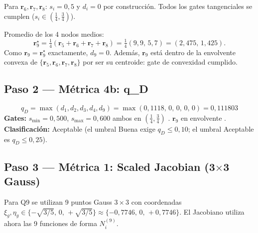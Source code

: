 \documentclass[11pt,a4paper]{article}
\begin{document}
\begin{stepbox}[title={Aristas restantes (nodos medios en el punto medio exacto)}]
Para $\mathbf{r}_6, \mathbf{r}_7, \mathbf{r}_8$: $s_i = 0{,}5$ y $d_i = 0$ por construcci\'on. Todos los gates tangenciales se cumplen ($s_i\in(\tfrac{1}{4},\tfrac{3}{4})$).
\end{stepbox}

\begin{stepbox}[title={Centroide $\mathbf{r}_9$}]
Promedio de los 4 nodos medios:
\[
\mathbf{r}_9^{\star} = \tfrac{1}{4}(\mathbf{r}_5+\mathbf{r}_6+\mathbf{r}_7+\mathbf{r}_8)
= \tfrac{1}{4}(9{,}9,\,5{,}7) = (2{,}475,\,1{,}425).
\]
Como $\mathbf{r}_9 = \mathbf{r}_9^{\star}$ exactamente, $d_9 = 0$. Adem\'as, $\mathbf{r}_9$ est\'a dentro de la envolvente convexa de $\{\mathbf{r}_5,\mathbf{r}_6,\mathbf{r}_7,\mathbf{r}_8\}$ por ser su centroide: gate de convexidad cumplido.
\end{stepbox}

\subsection{Paso 2 --- M\'etrica 4b: q\_D}

\begin{resultbox}[title={M\'etrica 4b: Admisibilidad Q9}]
\[
\boxed{\;q_D = \max(d_1,d_2,d_3,d_4,d_9) = \max(0{,}1118,\,0,\,0,\,0,\,0) = 0{,}111803\;}
\]
\textbf{Gates:} $s_{\min}=0{,}500$, $s_{\max}=0{,}600$ ambos en $(\tfrac{1}{4},\tfrac{3}{4})$ \checkmark. $\mathbf{r}_9$ en envolvente \checkmark.\\
\textbf{Clasificaci\'on:} Aceptable (el umbral Buena exige $q_D \le 0{,}10$; el umbral Aceptable es $q_D \le 0{,}25$).
\end{resultbox}

\subsection{Paso 3 --- M\'etrica 1: Scaled Jacobian (3$\times$3 Gauss)}

Para Q9 se utilizan 9 puntos Gauss $3\!\times\!3$ con coordenadas $\xi_g,\eta_g\in\{-\sqrt{3/5},\,0,\,+\sqrt{3/5}\} \approx \{-0{,}7746,\,0,\,+0{,}7746\}$. El Jacobiano utiliza ahora las 9 funciones de forma $N_i^{(9)}$.
\end{document}
